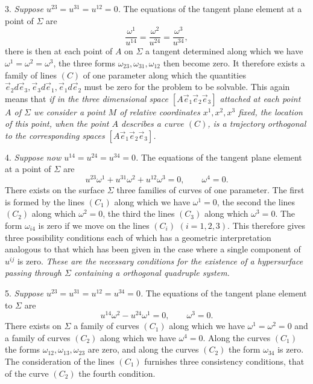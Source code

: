 \documentclass[leqno,11pt]{book}
\numberwithin{equation}{chapter}
\theoremstyle{shape1}
\theoremstyle{shape0}
\theoremstyle{shape2}
\theoremstyle{definition}
\begin{document}
3. \emph{Suppose $u^{23}=u^{31}=u^{12}=0$.} The equations of the tangent plane element at a point of $\Sigma$ are
\[
\frac{\omega^{1}}{u^{14}}=\frac{\omega^{2}}{u^{24}}=\frac{\omega^{3}}{u^{34}},
\]
there is then at each point of $A$ on $\Sigma$ a tangent determined along which we have $\omega^{1}=\omega^{2}=\omega^{3}$, the three forms $\omega_{23},\omega_{31},\omega_{12}$ then become zero. It therefore exists a family of lines $(C)$ of one parameter along which the quantities $\vec e_{2}d\vec e_{3},\vec e_{3}d\vec e_{1},\vec e_{1}d\vec e_{2}$ must be zero for the problem to be solvable. This again means that \emph{if in the three dimensional space $[A\vec e_{1}\vec e_{2}\vec e_{3}]$ attached at each point $A$ of $\Sigma$ we consider a point $M$ of relative coordinates $x^{1},x^{2},x^{3}$ fixed, the location of this point, when the point $A$ describes a curve $(C)$, is a trajectory orthogonal to the corresponding spaces $[A\vec e_{1}\vec e_{2}\vec e_{3}]$.}

4. \emph{Suppose now $u^{14}=u^{24}=u^{34}=0$.} The equations of the tangent plane element at a point of $\Sigma$ are
\[
u^{23}\omega^{1}+u^{31}\omega^{2}+u^{12}\omega^{3}=0,\qquad\omega^{4}=0.
\]
There exists on the surface $\Sigma$ three families of curves of one parameter. The first is formed by the lines $(C_{1})$ along which we have $\omega^{1}=0$, the second the lines $(C_{2})$ along which $\omega^{2}=0$, the third the lines $(C_{3})$ along which $\omega^{3}=0$. The form $\omega_{i4}$ is zero if we move on the lines $(C_{i})$ $(i=1,2,3)$. This therefore gives three possibility conditions each of which has a geometric interpretation analogous to that which has been given in the case where a single component of $u^{ij}$ is zero. \emph{These are the necessary conditions for the existence of a hypersurface passing through $\Sigma$ containing a orthogonal quadruple system.}

5. \emph{Suppose $u^{23}=u^{31}=u^{12}=u^{34}=0$.} The equations of the tangent plane element to $\Sigma$ are
\[
u^{14}\omega^{2}-u^{24}\omega^{1}=0,\qquad\omega^{3}=0.
\]
There exists on $\Sigma$ a family of curves $(C_{1})$ along which we have $\omega^{1}=\omega^{2}=0$ and a family of curves $(C_{2})$ along which we have $\omega^{4}=0$. Along the curves $(C_{1})$ the forms $\omega_{12},\omega_{13},\omega_{23}$ are zero, and along the curves $(C_{2})$ the form $\omega_{34}$ is zero. The consideration of the lines $(C_{1})$ furnishes three consistency conditions, that of the curve $(C_{2})$ the fourth condition.
\end{document}
